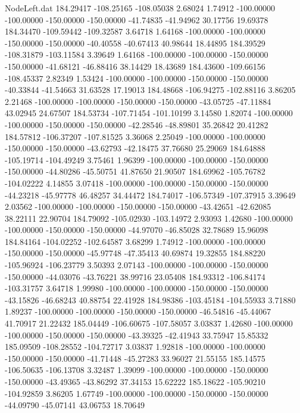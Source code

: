 \begin{filecontents}{NodeLeft.dat}
 184.29417 -108.25165 -108.05038     2.68024    1.74912 -100.00000 -100.00000 -150.00000 -150.00000  -41.74835  -41.94962   30.17756   19.69378
 184.34470 -109.59442 -109.32587     3.64718    1.64168 -100.00000 -100.00000 -150.00000 -150.00000  -40.40558  -40.67413   40.98644   18.44895
 184.39529 -108.31879 -103.11584     3.39649    1.64168 -100.00000 -100.00000 -150.00000 -150.00000  -41.68121  -46.88416   38.14429   18.43689
 184.43600 -109.66156 -108.45337     2.82349    1.53424 -100.00000 -100.00000 -150.00000 -150.00000  -40.33844  -41.54663   31.63528   17.19013
 184.48668 -106.94275 -102.88116     3.86205    2.21468 -100.00000 -100.00000 -150.00000 -150.00000  -43.05725  -47.11884   43.02945   24.67507
 184.53734 -107.71454 -101.10199     3.14580    1.82074 -100.00000 -100.00000 -150.00000 -150.00000  -42.28546  -48.89801   35.26842   20.41282
 184.57812 -106.37207 -107.81525     3.36068    2.25049 -100.00000 -100.00000 -150.00000 -150.00000  -43.62793  -42.18475   37.76680   25.29069
 184.64888 -105.19714 -104.49249     3.75461    1.96399 -100.00000 -100.00000 -150.00000 -150.00000  -44.80286  -45.50751   41.87650   21.90507
 184.69962 -105.76782 -104.02222     4.14855    3.07418 -100.00000 -100.00000 -150.00000 -150.00000  -44.23218  -45.97778   46.48257   34.44472
 184.74017 -106.57349 -107.37915     3.39649    2.03562 -100.00000 -100.00000 -150.00000 -150.00000  -43.42651  -42.62085   38.22111   22.90704
 184.79092 -105.02930 -103.14972     2.93093    1.42680 -100.00000 -100.00000 -150.00000 -150.00000  -44.97070  -46.85028   32.78689   15.96098
 184.84164 -104.02252 -102.64587     3.68299    1.74912 -100.00000 -100.00000 -150.00000 -150.00000  -45.97748  -47.35413   40.69874   19.32855
 184.88220 -105.96924 -106.23779     3.50393    2.07143 -100.00000 -100.00000 -150.00000 -150.00000  -44.03076  -43.76221   38.99716   23.05408
 184.93312 -106.84174 -103.31757     3.64718    1.99980 -100.00000 -100.00000 -150.00000 -150.00000  -43.15826  -46.68243   40.88754   22.41928
 184.98386 -103.45184 -104.55933     3.71880    1.89237 -100.00000 -100.00000 -150.00000 -150.00000  -46.54816  -45.44067   41.70917   21.22432
 185.04449 -106.60675 -107.58057     3.03837    1.42680 -100.00000 -100.00000 -150.00000 -150.00000  -43.39325  -42.41943   33.75947   15.85332
 185.09509 -108.28552 -104.72717     3.03837    1.92818 -100.00000 -100.00000 -150.00000 -150.00000  -41.71448  -45.27283   33.96027   21.55155
 185.14575 -106.50635 -106.13708     3.32487    1.39099 -100.00000 -100.00000 -150.00000 -150.00000  -43.49365  -43.86292   37.34153   15.62222
 185.18622 -105.90210 -104.92859     3.86205    1.67749 -100.00000 -100.00000 -150.00000 -150.00000  -44.09790  -45.07141   43.06753   18.70649

\end{filecontents}
